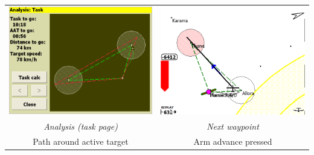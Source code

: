 \documentclass[a4paper,12pt]{refrep}
\begin{document}
\begin{maxipage}
\begin{center}
\begin{longtable}{|c|c|}
\midrule
\includegraphics[angle=0,width=0.45\linewidth,keepaspectratio='true']{figures/faat05.png} & 
\includegraphics[angle=0,width=0.45\linewidth,keepaspectratio='true']{figures/faat06.png} \\
{\em Analysis (task page)} & {\em Next waypoint} \\
Path around active target  & Arm advance pressed \\
\bottomrule
\end{longtable}
\end{center}
\end{maxipage}
\end{document}
